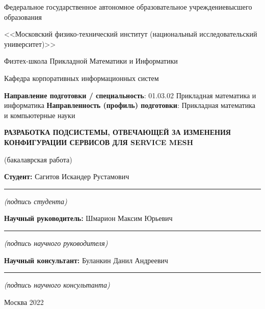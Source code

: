 \documentclass[14pt]{extarticle}
\renewcommand*{\maketitle}{
\begin{titlepage}
  \begin{center}
    \linespread{1}
    \small
    Федеральное государственное автономное образовательное учреждение\break высшего образования\par
    <<Московский физико-технический институт \break (национальный исследовательский университет)>>\par
    Физтех-школа Прикладной Математики и Информатики\par
    Кафедра корпоративных информационных систем\par
  \end{center}
%
  {
    \small
    {\bf Направление подготовки / специальность}: 01.03.02 Прикладная математика и информатика\newline
    {\bf Направленность (профиль) подготовки}: Прикладная математика и компьютерные науки
  }
%
  {
    \topskip0pt
    \vspace*{\fill}
    \begin{center}
      {\bf\Large РАЗРАБОТКА ПОДСИСТЕМЫ, ОТВЕЧАЮЩЕЙ ЗА ИЗМЕНЕНИЯ КОНФИГУРАЦИИ СЕРВИСОВ ДЛЯ SERVICE MESH
      \break }\par
      (бакалаврская работа)
    \end{center}
    \vspace*{\fill}
  }
%
  \hfill
  \begin{minipage}[t]{8cm}
    {\bf Студент: \newline}
    Сагитов Искандер Рустамович\newline
    \vspace{-3mm}
    \rule{8cm}{0.15mm}
    \centerline{\scriptsize\it (подпись студента)}\newline
%
    {\bf Научный руководитель: \newline}
    Шмарион Максим Юрьевич\newline
    \vspace{-3mm}
    \rule{8cm}{0.15mm}
    \centerline{\scriptsize\it (подпись научного руководителя)}\newline
%
    {\bf Научный консультант: \newline}
    Буланкин Данил Андреевич \newline
    \vspace{-3mm}
    \rule{8cm}{0.15mm}
    \centerline{\scriptsize\it (подпись научного консультанта)}
%
  \end{minipage}

    \vspace*{\fill}
    \begin{center}
      Москва 2022
    \end{center}
\end{titlepage}
}
\begin{document}
\maketitle

\newpage
\setcounter{page}{2}

\vspace*{\fill}
\begin{abstract}

Данная работа посвящена иследованию существующих решений Service Mesh и проектированию архитектуры для собственной реализации данного приложения. Также в работе реализуется часть спроектированного Service Mesh такие как набора инструментов для упрощенного создания прокси для управления всем траффиком в сети, где будет работать Service Mesh и подсистема Controller, отвечающая за доставление необходимых настроек до этих прокси.\end{abstract}
\vspace*{\fill}

\newpage
\tableofcontents
\newpage






\newpage
\printbibliography[title=Источники]
\end{document}
